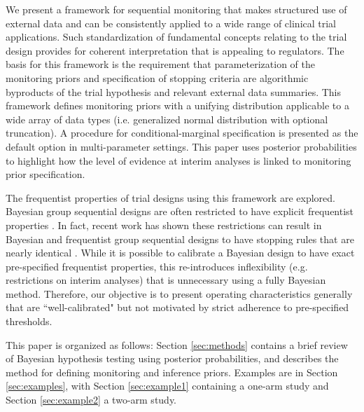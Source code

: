 \documentclass[useAMS,usenatbib,referee]{biom}
\begin{document}
We present a framework for sequential monitoring that makes structured use of external data and can be consistently applied to a wide range of clinical trial applications. Such standardization of fundamental concepts relating to the trial design provides for coherent interpretation that is appealing to regulators. The basis for this framework is the requirement that parameterization of the monitoring priors and specification of stopping criteria are algorithmic byproducts of the trial hypothesis and relevant external data summaries. This framework defines monitoring priors with a unifying distribution applicable to a wide array of data types (i.e. generalized normal distribution with optional truncation). A procedure for conditional-marginal specification is presented as the default option in multi-parameter settings. This paper uses posterior probabilities to highlight how the level of evidence at interim analyses is linked to monitoring prior specification. 

The frequentist properties of trial designs using this framework are explored. Bayesian group sequential designs are often restricted to have explicit frequentist properties \citep{Ventz2015, Zhu2015}. In fact, recent work has shown these restrictions can result in Bayesian and frequentist group sequential designs to have stopping rules that are nearly identical \citep{Stallard2020, Kopp-Schneider2019, Zhu2019}.
While it is possible to calibrate a Bayesian design to have exact pre-specified frequentist properties, this re-introduces inflexibility (e.g. restrictions on interim analyses) that is unnecessary using a fully Bayesian method. Therefore, our objective is to present operating characteristics generally that are ``well-calibrated" \citep{Grieve2016} but not motivated by strict adherence to pre-specified thresholds.

This paper is organized as follows: Section \ref{sec:methods} contains a brief review of Bayesian hypothesis testing using posterior probabilities, and describes the method for defining monitoring and inference priors. Examples are in Section \ref{sec:examples}, with Section \ref{sec:example1} containing a one-arm study and Section \ref{sec:example2} a two-arm study.

\end{document}
